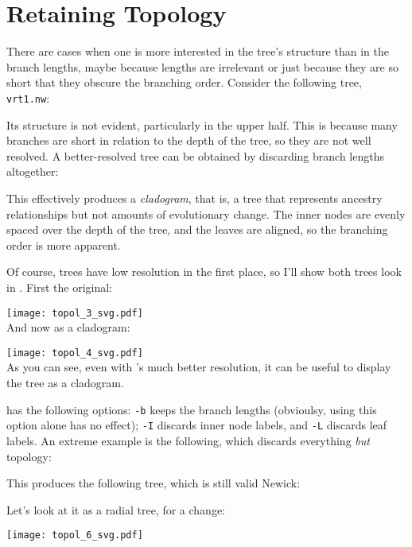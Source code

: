 \section{Retaining Topology}
\label{sct_topology}

There are cases when one is more interested in the tree's structure than in the
branch lengths, maybe because lengths are irrelevant or just because they are
so short that they obscure the branching order. Consider the following tree,
\texttt{vrt1.nw}:
\begin{samepage}

\end{samepage}
Its structure is not evident, particularly in the upper half. This is because
many branches are short in relation to the depth of the tree, so they are not
well resolved. A better-resolved tree can be obtained by discarding branch
lengths altogether:

\begin{samepage}

\end{samepage}
This effectively produces a \emph{cladogram}, that is, a tree that represents
ancestry relationships but not amounts of evolutionary change. The inner nodes
are evenly spaced over the depth of the tree, and the leaves are aligned, so
the branching order is more apparent.

Of course, \ascii{} trees have low resolution in the first place, so I'll show
both trees look in \svg. First the original: 

\texttt{[image: topol\_3\_svg.pdf]} \\

\noindent{}And now as a cladogram:

\texttt{[image: topol\_4\_svg.pdf]} \\
As you can see, even with \svg{}'s much better resolution, it can be useful to
display the tree as a cladogram.

\topology{} has the following options: \texttt{-b} keeps the branch lengths (obvioulsy, using this option alone has no effect); \texttt{-I} discards inner node labels, and \texttt{-L} discards leaf labels. An extreme example is the following, which discards everything \emph{but} topology:

This produces the following tree, which is still valid Newick:

Let's look at it as a radial tree, for a change:

\begin{center}
\texttt{[image: topol\_6\_svg.pdf]}
\end{center}

